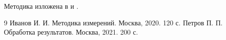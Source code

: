 Методика изложена в \cite{ivanov} и \cite{petrov}.

\begin{thebibliography}{9}
   Иванов И. И. Методика измерений. Москва, 2020. 120 с.
   Петров П. П. Обработка результатов. Москва, 2021. 200 с.
\end{thebibliography}
